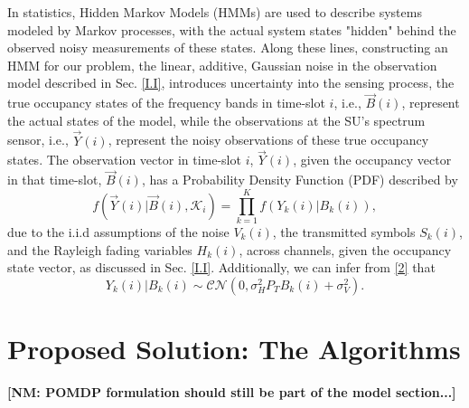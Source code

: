 \documentclass[12pt, draftcls, onecolumn]{IEEEtran}
\newcommand{\nm}[1]{{\color{blue}\bf{[NM: #1]}}}
\newcommand{\add}[1]{{\color{red}{#1}}}
\begin{document}
In statistics, Hidden Markov Models (HMMs) are used to describe systems modeled by Markov processes, with the actual system states "hidden" behind the observed noisy measurements of these states. Along these lines, constructing an HMM for our problem, the linear, additive, Gaussian noise in the observation model described in Sec. \ref{I.I}, introduces uncertainty into the sensing process, the true occupancy states of the frequency bands in time-slot $i$, i.e., $\vec{B}(i)$, represent the actual states of the model, while the observations at the SU's spectrum sensor, i.e., $\vec{Y}(i)$, represent the noisy observations of these true occupancy states. The observation vector in time-slot $i$, $\vec{Y}(i)$, given the occupancy vector in that time-slot, $\vec{B}(i)$, has a Probability Density Function (PDF) described by
\begin{equation}\label{8}
    f(\vec{Y}(i)|\vec{B}(i),\mathcal{K}_{i})=\prod_{k=1}^{K}f(Y_{k}(i)|B_{k}(i)),
\end{equation}
due to the i.i.d assumptions of the noise $V_{k}(i)$, the transmitted symbols $S_{k}(i)$, and the Rayleigh fading variables $H_{k}(i)$, across channels, given the occupancy state vector, as discussed in Sec. \ref{I.I}. Additionally, we can infer from \eqref{2} that
\begin{equation}\label{9}
    Y_{k}(i)|B_{k}(i)\sim\mathcal{CN}(0,\sigma_{H}^{2}P_{T}B_{k}(i)+\sigma_{V}^{2}).
\end{equation}

\subsection{\add{POMPD formulation}}

\section{Proposed Solution: The Algorithms}\label{II}
\nm{POMDP formulation should still be part of the model section...}
\end{document}
